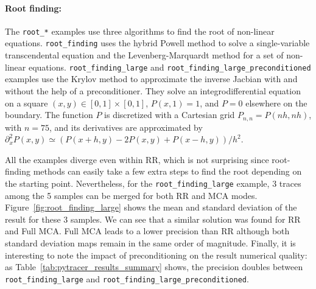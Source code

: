 \documentclass[11pt]{article}
\begin{document}
\paragraph{Root finding:}

The \texttt{root\_*} examples use three algorithms to 
find the root of non-linear equations. \texttt{root\_finding}
uses the hybrid Powell method to solve a single-variable transcendental equation and 
the Levenberg-Marquardt method for a set of non-linear equations. 
\texttt{root\_finding\_large} and \texttt{root\_finding\_large\_preconditioned} examples use 
the Krylov method to approximate the inverse Jacbian with and without the help of a preconditioner. 
They solve an integrodifferential equation on a square
 $(x,y) \in [0,1] \times [0,1]$, $P(x,1)=1$, and $P=0$ elsewhere on the boundary.
The function $P$ is discretized with a Cartesian grid $P_{n,n}=P(nh,nh)$, with $n=75$, and its derivatives are approximated by $\partial_x^2P(x,y) \simeq (P(x+h,y) - 2P(x,y) + P(x-h,y))/h^2$.


All the examples diverge even within RR, which is not surprising since root-finding methods can easily take a few extra steps to find the root depending on the starting point. Nevertheless, for the \texttt{root\_finding\_large} example, 3 traces among the 5 samples can be merged for both RR and MCA modes.
Figure~\ref{fig:root_finding_large} shows the mean and standard deviation of the result for these 3 samples. We can see that a similar solution was found for RR and Full MCA. Full MCA leads to a lower precision than RR although both standard deviation maps remain in the same order of magnitude. 
Finally, it is interesting to note the impact of preconditioning on the result numerical quality: as Table~\ref{tab:pytracer_results_summary} shows, the precision doubles between \texttt{root\_finding\_large} and \texttt{root\_finding\_large\_preconditioned}.
\end{document}
